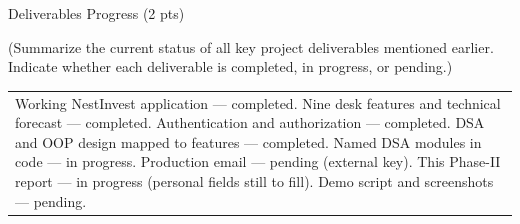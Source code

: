 \documentclass[12pt,a4paper]{article}
\newcommand{\sectiontitle}[1]{%
    {\color{GEUBlue}
    \fontsize{18}{22}\selectfont #1}
}
\newcommand{\instruction}[1]{%
    {\color{InstructionGrey}
    \fontsize{10.5}{13}\selectfont #1}
}
\newcommand{\answerbox}[2]{%
    \begin{tabularx}{\textwidth}{
        |>{\raggedright\arraybackslash}X|}
        \hline
        \parbox[t][#1][t]{\dimexpr\linewidth-12pt\relax}{
            \vspace{5pt}
            \fontsize{11}{13}\selectfont #2
        }\\
        \hline
    \end{tabularx}
}
\begin{document}
\vspace{0.65cm}

\sectiontitle{Deliverables Progress (2 pts)}

\vspace{0.05cm}

\instruction{
(Summarize the current status of all key project deliverables
mentioned earlier. Indicate whether each deliverable is completed,
in progress, or pending.)
}

\vspace{0.25cm}

\answerbox{3.20cm}{Working NestInvest application --- completed. Nine desk features and technical forecast --- completed. Authentication and authorization --- completed. DSA and OOP design mapped to features --- completed. Named DSA modules in code --- in progress. Production email --- pending (external key). This Phase-II report --- in progress (personal fields still to fill). Demo script and screenshots --- pending.}
\end{document}
